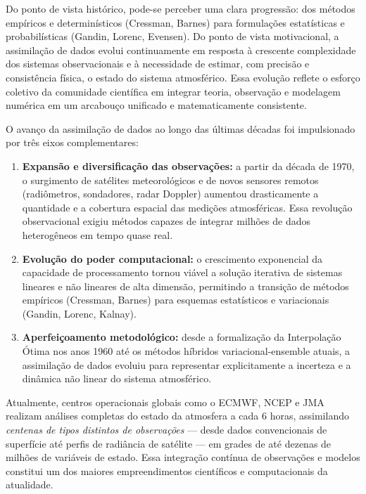 Do ponto de vista histórico, pode-se perceber uma clara progressão: dos métodos empíricos e determinísticos (Cressman, Barnes) para formulações estatísticas e probabilísticas (Gandin, Lorenc, Evensen). Do ponto de vista motivacional, a assimilação de dados evolui continuamente em resposta à crescente complexidade dos sistemas observacionais e à necessidade de estimar, com precisão e consistência física, o estado do sistema atmosférico. Essa evolução reflete o esforço coletivo da comunidade científica em integrar teoria, observação e modelagem numérica em um arcabouço unificado e matematicamente consistente.


\begin{comentario}
O avanço da assimilação de dados ao longo das últimas décadas foi impulsionado por três eixos complementares:
\begin{enumerate}
  \item \textbf{Expansão e diversificação das observações:} a partir da década de 1970, o surgimento de satélites meteorológicos e de novos sensores remotos (radiômetros, sondadores, radar Doppler) aumentou drasticamente a quantidade e a cobertura espacial das medições atmosféricas. Essa revolução observacional exigiu métodos capazes de integrar milhões de dados heterogêneos em tempo quase real.
  \item \textbf{Evolução do poder computacional:} o crescimento exponencial da capacidade de processamento tornou viável a solução iterativa de sistemas lineares e não lineares de alta dimensão, permitindo a transição de métodos empíricos (Cressman, Barnes) para esquemas estatísticos e variacionais (Gandin, Lorenc, Kalnay).
  \item \textbf{Aperfeiçoamento metodológico:} desde a formalização da Interpolação Ótima nos anos 1960 até os métodos híbridos variacional-ensemble atuais, a assimilação de dados evoluiu para representar explicitamente a incerteza e a dinâmica não linear do sistema atmosférico.
\end{enumerate}

Atualmente, centros operacionais globais como o ECMWF, NCEP e JMA realizam análises completas do estado da atmosfera a cada 6 horas, assimilando \textit{centenas de tipos distintos de observações} — desde dados convencionais de superfície até perfis de radiância de satélite — em grades de até dezenas de milhões de variáveis de estado. Essa integração contínua de observações e modelos constitui um dos maiores empreendimentos científicos e computacionais da atualidade.
\end{comentario}

